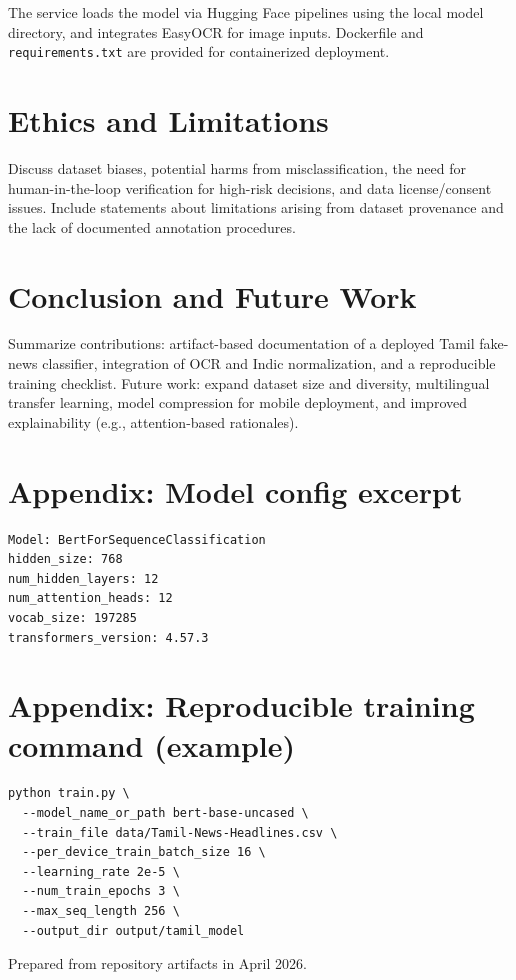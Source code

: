 \documentclass[11pt,a4paper]{article}
\begin{document}
The service loads the model via Hugging Face pipelines using the local model directory, and integrates EasyOCR for image inputs. Dockerfile and \texttt{requirements.txt} are provided for containerized deployment.

\section{Ethics and Limitations}
Discuss dataset biases, potential harms from misclassification, the need for human-in-the-loop verification for high-risk decisions, and data license/consent issues. Include statements about limitations arising from dataset provenance and the lack of documented annotation procedures.

\section{Conclusion and Future Work}
Summarize contributions: artifact-based documentation of a deployed Tamil fake-news classifier, integration of OCR and Indic normalization, and a reproducible training checklist. Future work: expand dataset size and diversity, multilingual transfer learning, model compression for mobile deployment, and improved explainability (e.g., attention-based rationales).

\section*{Appendix: Model config excerpt}
\begin{verbatim}
Model: BertForSequenceClassification
hidden_size: 768
num_hidden_layers: 12
num_attention_heads: 12
vocab_size: 197285
transformers_version: 4.57.3
\end{verbatim}

\section*{Appendix: Reproducible training command (example)}
\begin{verbatim}
python train.py \
  --model_name_or_path bert-base-uncased \
  --train_file data/Tamil-News-Headlines.csv \
  --per_device_train_batch_size 16 \
  --learning_rate 2e-5 \
  --num_train_epochs 3 \
  --max_seq_length 256 \
  --output_dir output/tamil_model
\end{verbatim}

\vspace{1cm}
\noindent Prepared from repository artifacts in April 2026.
\end{document}
